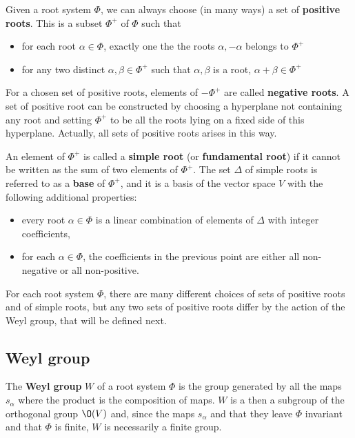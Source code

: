\documentclass{worksheetclass}
\renewcommand{\emph}{\textbf}
\begin{document}
        Given a root system $\Phi$, we can always choose (in many ways) a set of \emph{positive roots}. This is a subset $\Phi^+$ of $\Phi$ such that
        \begin{itemize}
            \item for each root $\alpha\in\Phi$, exactly one the the roots $\alpha,-\alpha$ belongs to $\Phi^+$
            \item for any two distinct $\alpha,\beta\in\Phi^+$ such that $\alpha,\beta$ is a root, $\alpha+\beta\in\Phi^+$
        \end{itemize}
        For a chosen set of positive roots, elements of $-\Phi^+$ are called \emph{negative roots}. A set of positive root can be constructed by choosing a hyperplane not containing any root and setting $\Phi^+$ to be all the roots lying on a fixed side of this hyperplane. Actually, all sets of positive roots arises in this way.

        An element of $\Phi^+$ is called a \emph{simple root} (or \emph{fundamental root}) if it cannot be written as the sum of two elements of $\Phi^+$. The set $\Delta$ of simple roots is referred to as a \emph{base} of $\Phi^+$, and it is a basis of the vector space $V$ with the following additional properties:
        \begin{itemize}
            \item every root $\alpha\in\Phi$ is a linear combination of elements of $\Delta$ with integer coefficients,
            \item for each $\alpha\in\Phi$, the coefficients in the previous point are either all non-negative or all non-positive.
        \end{itemize}
        For each root system $\Phi$, there are many different choices of sets of positive roots and of simple roots, but any two sets of positive roots differ by the action of the Weyl group, that will be defined next.

    \subsection{Weyl group}

        The \emph{Weyl group} $W$ of a root system $\Phi$ is the group generated by all the maps $s_\alpha$ where the product is the composition of maps. $W$ is a then a subgroup of the orthogonal group $\O(V)$ and, since the maps $s_\alpha$ and that they leave $\Phi$ invariant and that $\Phi$ is finite, $W$ is necessarily a finite group.
\end{document}
